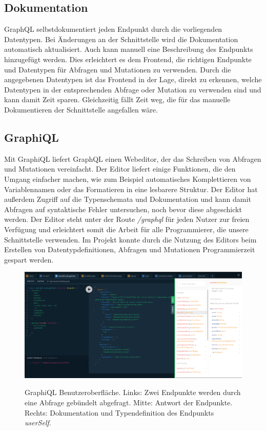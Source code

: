 \subsection{Dokumentation}
GraphQL selbstdokumentiert jeden Endpunkt durch die vorliegenden Datentypen.
Bei Änderungen an der Schnittstelle wird die Dokumentation automatisch aktualisiert. Auch kann manuell eine Beschreibung des Endpunkts hinzugefügt werden. Dies erleichtert es dem Frontend, die richtigen Endpunkte und Datentypen für Abfragen und Mutationen zu verwenden. Durch die angegebenen Datentypen ist das Frontend in der Lage, direkt zu erkennen, welche Datentypen in der entsprechenden Abfrage oder Mutation zu verwenden sind und kann damit Zeit sparen.
Gleichzeitig fällt Zeit weg, die für das manuelle Dokumentieren der Schnittstelle angefallen wäre.

\subsection{GraphiQL}
Mit GraphiQL liefert GraphQL einen Webeditor, der das Schreiben von Abfragen und Mutationen vereinfacht.
Der Editor liefert einige Funktionen, die den Umgang einfacher machen, wie zum Beispiel automatisches Komplettieren von Variablennamen oder das Formatieren in eine lesbarere Struktur.
Der Editor hat außerdem Zugriff auf die Typenschemata und Dokumentation und kann damit Abfragen auf syntaktische Fehler untersuchen, noch bevor diese abgeschickt werden.
Der Editor steht unter der Route \textit{/graphql} für jeden Nutzer zur freien Verfügung und erleichtert somit die Arbeit für alle Programmierer, die unsere Schnittstelle verwenden.
Im Projekt konnte durch die Nutzung des Editors beim Erstellen von Datentypdefinitionen, Abfragen und Mutationen Programmierzeit gespart werden.

\begin{figure}
	\centering
    \includegraphics[width=\textwidth]{sources/graphiql.png}\cite{}
	\caption{GraphiQL Benutzeroberfläche. Links: Zwei Endpunkte werden durch eine Abfrage gebündelt abgefragt. Mitte: Antwort der Endpunkte. Rechts: Dokumentation und Typendefinition des Endpunkts \textit{userSelf}.}
	\label{fig:gql:1}
\end{figure}

